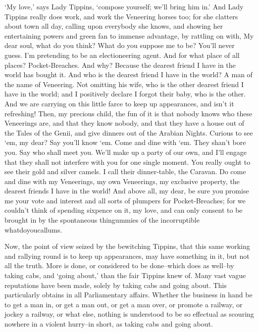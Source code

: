 ‘My love,’ says Lady Tippins, ‘compose yourself; we’ll bring him in.’
And Lady Tippins really does work, and work the Veneering horses too;
for she clatters about town all day, calling upon everybody she knows,
and showing her entertaining powers and green fan to immense advantage,
by rattling on with, My dear soul, what do you think? What do
you suppose me to be? You’ll never guess. I’m pretending to be an
electioneering agent. And for what place of all places? Pocket-Breaches.
And why? Because the dearest friend I have in the world has bought it.
And who is the dearest friend I have in the world? A man of the name of
Veneering. Not omitting his wife, who is the other dearest friend I have
in the world; and I positively declare I forgot their baby, who is the
other. And we are carrying on this little farce to keep up appearances,
and isn’t it refreshing! Then, my precious child, the fun of it is that
nobody knows who these Veneerings are, and that they know nobody, and
that they have a house out of the Tales of the Genii, and give dinners
out of the Arabian Nights. Curious to see ‘em, my dear? Say you’ll know
‘em. Come and dine with ‘em. They shan’t bore you. Say who shall meet
you. We’ll make up a party of our own, and I’ll engage that they shall
not interfere with you for one single moment. You really ought to see
their gold and silver camels. I call their dinner-table, the Caravan.
Do come and dine with my Veneerings, my own Veneerings, my exclusive
property, the dearest friends I have in the world! And above all, my
dear, be sure you promise me your vote and interest and all sorts of
plumpers for Pocket-Breaches; for we couldn’t think of spending sixpence
on it, my love, and can only consent to be brought in by the spontaneous
thingummies of the incorruptible whatdoyoucallums.

Now, the point of view seized by the bewitching Tippins, that this same
working and rallying round is to keep up appearances, may have something
in it, but not all the truth. More is done, or considered to be
done--which does as well--by taking cabs, and ‘going about,’ than the
fair Tippins knew of. Many vast vague reputations have been made,
solely by taking cabs and going about. This particularly obtains in all
Parliamentary affairs. Whether the business in hand be to get a man in,
or get a man out, or get a man over, or promote a railway, or jockey
a railway, or what else, nothing is understood to be so effectual as
scouring nowhere in a violent hurry--in short, as taking cabs and going
about.

